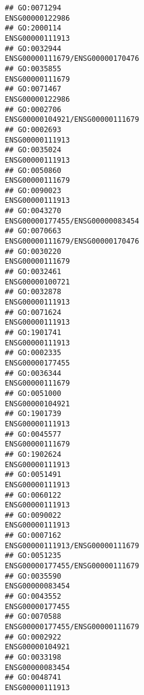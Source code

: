 \documentclass[
]{article}
\begin{document}
\begin{verbatim}
## GO:0071294                                                 ENSG00000122986
## GO:2000114                                                 ENSG00000111913
## GO:0032944                                 ENSG00000111679/ENSG00000170476
## GO:0035855                                                 ENSG00000111679
## GO:0071467                                                 ENSG00000122986
## GO:0002706                                 ENSG00000104921/ENSG00000111679
## GO:0002693                                                 ENSG00000111913
## GO:0035024                                                 ENSG00000111913
## GO:0050860                                                 ENSG00000111679
## GO:0090023                                                 ENSG00000111913
## GO:0043270                                 ENSG00000177455/ENSG00000083454
## GO:0070663                                 ENSG00000111679/ENSG00000170476
## GO:0030220                                                 ENSG00000111679
## GO:0032461                                                 ENSG00000100721
## GO:0032878                                                 ENSG00000111913
## GO:0071624                                                 ENSG00000111913
## GO:1901741                                                 ENSG00000111913
## GO:0002335                                                 ENSG00000177455
## GO:0036344                                                 ENSG00000111679
## GO:0051000                                                 ENSG00000104921
## GO:1901739                                                 ENSG00000111913
## GO:0045577                                                 ENSG00000111679
## GO:1902624                                                 ENSG00000111913
## GO:0051491                                                 ENSG00000111913
## GO:0060122                                                 ENSG00000111913
## GO:0090022                                                 ENSG00000111913
## GO:0007162                                 ENSG00000111913/ENSG00000111679
## GO:0051235                                 ENSG00000177455/ENSG00000111679
## GO:0035590                                                 ENSG00000083454
## GO:0043552                                                 ENSG00000177455
## GO:0070588                                 ENSG00000177455/ENSG00000111679
## GO:0002922                                                 ENSG00000104921
## GO:0033198                                                 ENSG00000083454
## GO:0048741                                                 ENSG00000111913

\end{verbatim}
\end{document}
